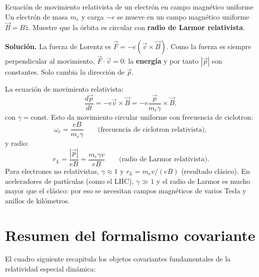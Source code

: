 \begin{ejemplo}{Ecuación de movimiento relativista de un electrón en campo magnético uniforme}{}
Un electrón de masa $m_e$ y carga $-e$ se mueve en un campo magnético uniforme $\vec{B} = B\hat{z}$. Muestre que la órbita es circular con \textbf{radio de Larmor relativista}.

\textbf{Solución.} La fuerza de Lorentz es $\vec{F} = -e(\vec{v}\times\vec{B})$. Como la fuerza es siempre perpendicular al movimiento, $\vec{F}\cdot\vec{v} = 0$: la \textbf{energía} y por tanto $|\vec{p}|$ son constantes. Solo cambia la dirección de $\vec{p}$.

La ecuación de movimiento relativista:
\[
  \frac{d\vec{p}}{dt} = -e\vec{v}\times\vec{B} = -e\frac{\vec{p}}{m_e\gamma}\times\vec{B},
\]
con $\gamma = \text{const}$. Esto da movimiento circular uniforme con frecuencia de ciclotron:
\[
  \omega_c = \frac{eB}{m_e\gamma} \qquad \text{(frecuencia de ciclotron relativista)},
\]
y radio:
\begin{equation}
  r_L = \frac{|\vec{p}|}{eB} = \frac{m_e\gamma v}{eB} \qquad \text{(radio de Larmor relativista)}.
  \label{eq:larmor}
\end{equation}
Para electrones no relativistas, $\gamma \approx 1$ y $r_L = m_e v/(eB)$ (resultado clásico). En aceleradores de partículas (como el LHC), $\gamma \gg 1$ y el radio de Larmor es mucho mayor que el clásico: por eso se necesitan campos magnéticos de varios Tesla y anillos de kilómetros.
\end{ejemplo}

\section{Resumen del formalismo covariante}

El cuadro siguiente recapitula los objetos covariantes fundamentales de la relatividad especial dinámica:

